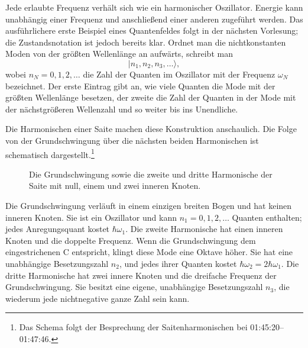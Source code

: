 Jede erlaubte Frequenz verhält sich wie ein harmonischer Oszillator. Energie kann unabhängig einer Frequenz und anschließend einer anderen zugeführt werden. Das ausführlichere erste Beispiel eines Quantenfeldes folgt in der nächsten Vorlesung; die Zustandsnotation ist jedoch bereits klar. Ordnet man die nichtkonstanten Moden von der größten Wellenlänge an aufwärts, schreibt man
\begin{equation}
|n_1,n_2,n_3,\ldots\rangle,
\end{equation}
wobei \(n_N=0,1,2,\ldots\) die Zahl der Quanten im Oszillator mit der Frequenz \(\omega_N\) bezeichnet. Der erste Eintrag gibt an, wie viele Quanten die Mode mit der größten Wellenlänge besetzen, der zweite die Zahl der Quanten in der Mode mit der nächstgrößeren Wellenzahl und so weiter bis ins Unendliche.

Die Harmonischen einer Saite machen diese Konstruktion anschaulich. Die Folge von der Grundschwingung über die nächsten beiden Harmonischen ist schematisch dargestellt.\footnote{Das Schema folgt der Besprechung der Saitenharmonischen bei 01:45:20--01:47:46.}

\begin{figure}[t]\centering
{}\caption{Die Grundschwingung sowie die zweite und dritte Harmonische der Saite mit null, einem und zwei inneren Knoten.}\end{figure}

Die Grundschwingung verläuft in einem einzigen breiten Bogen und hat keinen inneren Knoten. Sie ist ein Oszillator und kann \(n_1=0,1,2,\ldots\) Quanten enthalten; jedes Anregungsquant kostet \(\hbar\omega_1\). Die zweite Harmonische hat einen inneren Knoten und die doppelte Frequenz. Wenn die Grundschwingung dem eingestrichenen C entspricht, klingt diese Mode eine Oktave höher. Sie hat eine unabhängige Besetzungszahl \(n_2\), und jedes ihrer Quanten kostet \(\hbar\omega_2=2\hbar\omega_1\). Die dritte Harmonische hat zwei innere Knoten und die dreifache Frequenz der Grundschwingung. Sie besitzt eine eigene, unabhängige Besetzungszahl \(n_3\), die wiederum jede nichtnegative ganze Zahl sein kann.

